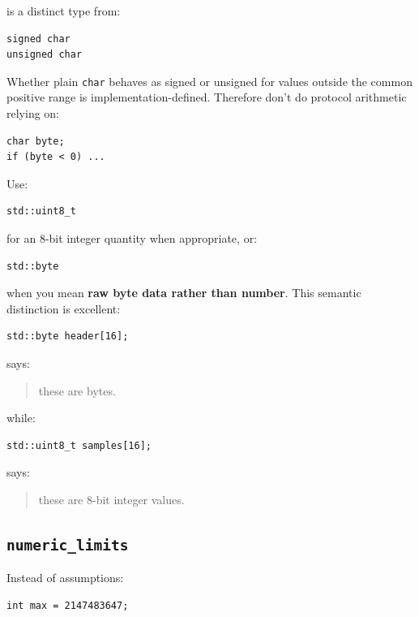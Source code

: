 is a distinct type from:

\begin{verbatim}
signed char
unsigned char
\end{verbatim}

Whether plain \texttt{char} behaves as signed or unsigned for values outside the common positive range is implementation-defined. Therefore don't do protocol arithmetic relying on:

\begin{verbatim}
char byte;
if (byte < 0) ...
\end{verbatim}

Use:

\begin{verbatim}
std::uint8_t
\end{verbatim}

for an 8-bit integer quantity when appropriate, or:

\begin{verbatim}
std::byte
\end{verbatim}

when you mean \textbf{raw byte data rather than number}. This semantic distinction is excellent:

\begin{verbatim}
std::byte header[16];
\end{verbatim}

says:

\begin{quote}
these are bytes.
\end{quote}

while:

\begin{verbatim}
std::uint8_t samples[16];
\end{verbatim}

says:

\begin{quote}
these are 8-bit integer values.
\end{quote}

\subsection{\texorpdfstring{\texttt{numeric\_limits}}{numeric\_limits}}\label{05-engine-i-ch002-numeric_limits}

Instead of assumptions:

\begin{verbatim}
int max = 2147483647;
\end{verbatim}

